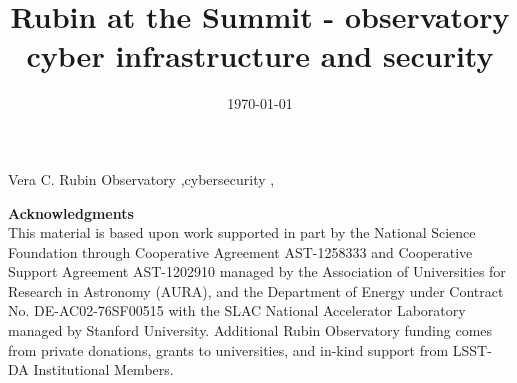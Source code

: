\documentclass[preprint,12pt]{elsarticle}
\begin{document}
\begin{frontmatter}



\date{\today}
\title{Rubin at the Summit - observatory cyber infrastructure and security}




\begin{keyword}
Vera C. Rubin Observatory \sep cybersecurity \sep


\end{keyword}

\end{frontmatter}





\textbf{Acknowledgments}\\
This material is based upon work supported in part by the National Science Foundation through Cooperative Agreement AST-1258333 and Cooperative Support Agreement AST-1202910 managed by the Association of Universities for Research in Astronomy (AURA), and the Department of Energy under Contract No. DE-AC02-76SF00515 with the SLAC National Accelerator Laboratory managed by Stanford University.
Additional Rubin Observatory funding comes from private donations, grants to universities, and in-kind support from LSST-DA Institutional Members.






\appendix

\end{document}

